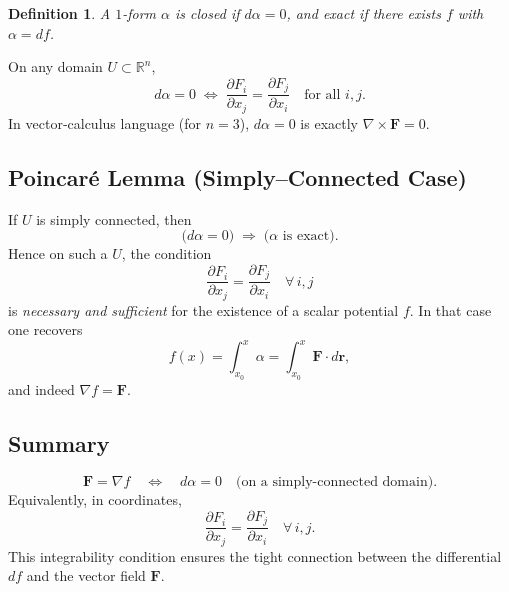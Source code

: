 \documentclass[12pt]{article}
\theoremstyle{definitionstyle}
\newtheorem{definition}{Definition} %
\newcommand{\R}{\mathbb{R}}
\begin{document}
	\begin{definition}
		A \(1\)-form \(\alpha\) is \emph{closed} if \(d\alpha=0\), and \emph{exact} if there exists \(f\) with \(\alpha=df\).
	\end{definition}
	
	On any domain \(U\subset\R^n\),
	\[
	d\alpha = 0
	\;\Longleftrightarrow\;
	\frac{\partial F_i}{\partial x_j}
	= \frac{\partial F_j}{\partial x_i}
	\quad\text{for all }i,j.
	\]
	In vector‐calculus language (for \(n=3\)), \(d\alpha=0\) is exactly \(\nabla\times\mathbf F=0\).
	
	\subsection*{Poincaré Lemma (Simply–Connected Case)}
	
	If \(U\) is simply connected, then
	\[
	\bigl(d\alpha=0\bigr)
	\;\Longrightarrow\;
	\bigl(\alpha\text{ is exact}\bigr).
	\]
	Hence on such a \(U\), the condition
	\[
	\frac{\partial F_i}{\partial x_j}
	= \frac{\partial F_j}{\partial x_i}
	\quad\forall\,i,j
	\]
	is \emph{necessary and sufficient} for the existence of a scalar potential \(f\).  In that case one recovers
	\[
	f(x)
	=\int_{x_0}^{x}\alpha
	=\int_{x_0}^{x}\mathbf F\cdot d\mathbf r,
	\]
	and indeed \(\nabla f=\mathbf F\).
	
	\subsection*{Summary}
	
	\[
	\mathbf F = \nabla f
	\quad\Longleftrightarrow\quad
	d\alpha = 0
	\quad\text{(on a simply‐connected domain).}
	\]
	Equivalently, in coordinates,
	\[
	\frac{\partial F_i}{\partial x_j}
	= \frac{\partial F_j}{\partial x_i}
	\quad\forall\,i,j.
	\]
	This integrability condition ensures the tight connection between the differential \(df\) and the vector field \(\mathbf F\).
\end{document}
